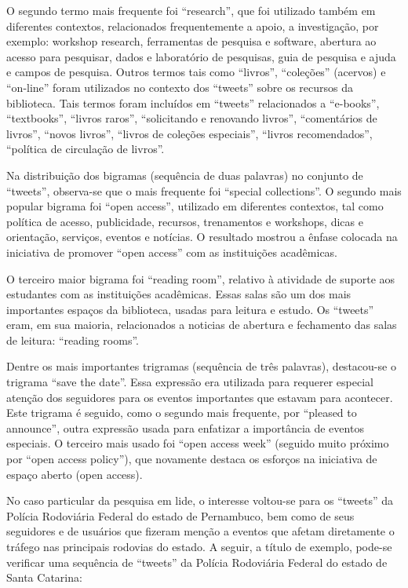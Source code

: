 O segundo termo mais frequente foi ``research'', que foi utilizado também em diferentes contextos, relacionados frequentemente a apoio, a investigação, por exemplo: workshop research, ferramentas de pesquisa e software, abertura ao acesso para pesquisar, dados e laboratório de pesquisas, guia de pesquisa e ajuda e campos de pesquisa. Outros termos tais como “livros”, “coleções” (acervos) e “on-line” foram utilizados no contexto dos ``tweets'' sobre os recursos da biblioteca. Tais termos foram incluídos em ``tweets'' relacionados a “e-books”, “textbooks”, “livros raros”, “solicitando e renovando livros”, “comentários de livros”, “novos livros”, “livros de coleções especiais”, “livros recomendados”, “política de circulação de livros”.

Na distribuição dos bigramas (sequência de duas palavras) no conjunto de ``tweets'', observa-se que o mais frequente foi “special collections”.
O segundo mais popular bigrama foi “open access”, utilizado em diferentes contextos, tal como política de acesso, publicidade, recursos, trenamentos e workshops, dicas e orientação, serviços, eventos e notícias. O resultado mostrou a ênfase colocada na iniciativa de promover “open access” com as instituições acadêmicas.

O terceiro maior bigrama foi “reading room”, relativo à atividade de suporte aos estudantes com as instituições acadêmicas. Essas salas são um dos mais importantes espaços da biblioteca, usadas para leitura e estudo. Os ``tweets'' eram, em sua maioria, relacionados a noticias de abertura e fechamento das salas de leitura: “reading rooms”.

Dentre os mais importantes trigramas (sequência de três palavras), destacou-se o trigrama “save the date”. Essa expressão era utilizada para requerer especial atenção dos seguidores para os eventos importantes que estavam para acontecer. Este trigrama é seguido, como o segundo mais frequente, por “pleased to announce”, outra expressão usada para enfatizar a importância de eventos especiais. O terceiro mais usado foi “open access week” (seguido muito próximo por “open access policy”), que novamente destaca os esforços na iniciativa de espaço aberto (open access). 

No caso particular da pesquisa em lide, o interesse voltou-se para os ``tweets'' da Polícia Rodoviária Federal do estado de Pernambuco, bem como de seus seguidores e de usuários que fizeram menção a eventos que afetam diretamente o tráfego nas principais rodovias do estado. A seguir, a título de exemplo, pode-se verificar uma sequência de ``tweets'' da Polícia Rodoviária Federal do estado de Santa Catarina:

